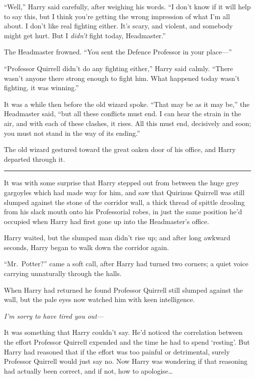 ``Well,'' Harry said carefully, after weighing his words. ``I don't know
if it will help to say this, but I think you're getting the wrong
impression of what I'm all about. I don't like real fighting either.
It's scary, and violent, and somebody might get hurt. But I
\emph{didn't} fight today, Headmaster.''

The Headmaster frowned. ``You sent the Defence Professor in your
place---''

``Professor Quirrell didn't do any fighting either,'' Harry said calmly.
``There wasn't anyone there strong enough to fight him. What happened
today wasn't fighting, it was winning.''

It was a while then before the old wizard spoke. ``That may be as it may
be,'' the Headmaster said, ``but all these conflicts must end. I can
hear the strain in the air, and with each of these clashes, it rises.
All this must end, decisively and soon; you must not stand in the way of
its ending.''

The old wizard gestured toward the great oaken door of his office, and
Harry departed through it.

\begin{center}\rule{3in}{0.4pt}\end{center}

It was with some surprise that Harry stepped out from between the huge
grey gargoyles which had made way for him, and saw that Quirinus
Quirrell was still slumped against the stone of the corridor wall, a
thick thread of spittle drooling from his slack mouth onto his
Professorial robes, in just the same position he'd occupied when Harry
had first gone up into the Headmaster's office.

Harry waited, but the slumped man didn't rise up; and after long awkward
seconds, Harry began to walk down the corridor again.

``Mr.~Potter?'' came a soft call, after Harry had turned two corners; a
quiet voice carrying unnaturally through the halls.

When Harry had returned he found Professor Quirrell still slumped
against the wall, but the pale eyes now watched him with keen
intelligence.

\emph{I'm sorry to have tired you out---}

It was something that Harry couldn't say. He'd noticed the correlation
between the effort Professor Quirrell expended and the time he had to
spend `resting'. But Harry had reasoned that if the effort was too
painful or detrimental, surely Professor Quirrell would just say no. Now
Harry was wondering if that reasoning had actually been correct, and if
not, how to apologise\ldots{}

